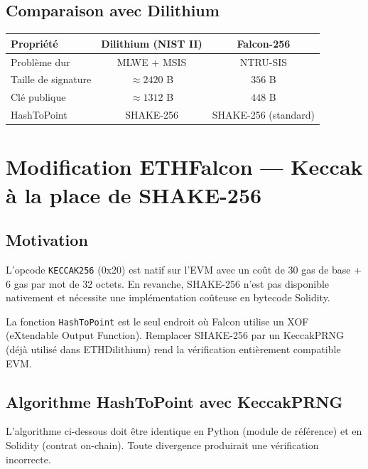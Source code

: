 \documentclass[11pt,a4paper]{article}
\begin{document}
\subsection{Comparaison avec Dilithium}

\begin{center}
\begin{tabular}{lcc}
\toprule
Propriété & Dilithium (NIST II) & Falcon-256 \\
\midrule
Problème dur       & MLWE + MSIS & NTRU-SIS \\
Taille de signature & $\approx 2420$ B & $356$ B \\
Clé publique        & $\approx 1312$ B & $448$ B \\
HashToPoint         & SHAKE-256 & SHAKE-256 (standard) \\
\bottomrule
\end{tabular}
\end{center}

\section{Modification ETHFalcon — Keccak à la place de SHAKE-256}

\subsection{Motivation}

L'opcode \texttt{KECCAK256} (0x20) est natif sur l'EVM avec un coût de 30 gas
de base + 6 gas par mot de 32 octets. En revanche, SHAKE-256 n'est pas
disponible nativement et nécessite une implémentation coûteuse en bytecode
Solidity.

La fonction \texttt{HashToPoint} est le seul endroit où Falcon utilise un XOF
(eXtendable Output Function). Remplacer SHAKE-256 par un KeccakPRNG (déjà
utilisé dans ETHDilithium) rend la vérification entièrement compatible EVM.

\subsection{Algorithme HashToPoint avec KeccakPRNG}

\begin{warningbox}[title={Compatibilité Python / Solidity}]
L'algorithme ci-dessous doit être identique en Python (module de référence) et
en Solidity (contrat on-chain). Toute divergence produirait une vérification
incorrecte.
\end{warningbox}
\end{document}
